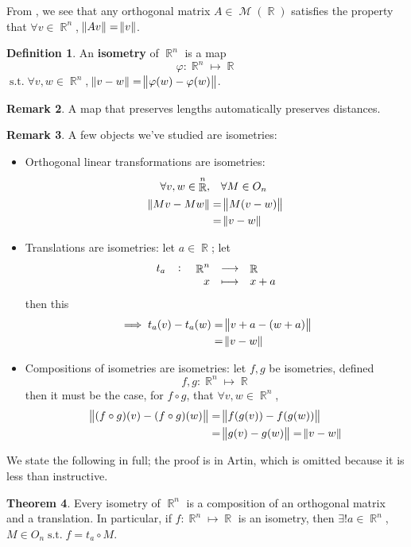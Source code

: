 \documentclass[11pt]{amsart} %
\theoremstyle{definition}
\newtheorem{definition}{Definition}[section]
\newtheorem{theorem}[definition]{Theorem}
\theoremstyle{definition}
\newtheorem{remark}[definition]{Remark}
\DeclareMathOperator{\R}{\mathbb{R}}
\DeclareMathOperator{\suchthat}{\text{ s.t. }}
\DeclareMathOperator{\Ma}{\mathcal{M}}
\numberwithin{equation}{section}
\begin{document}
From , we see that any orthogonal matrix $A \in \Ma (\R)$ satisfies the property that $\forall v \in \R^n$, $\norm{Av} = \norm{v} $. 

\begin{definition}
	An \textbf{isometry} of $\R^n$ is a map
	$$\varphi : \R^n \mapsto \R$$
	$\suchthat \forall v,w \in \R^n$, $\norm{v-w} = \norm{\varphi(w) - \varphi(w) }  $.
\end{definition}

\begin{remark}
	A map that preserves lengths automatically preserves distances.
\end{remark}

\begin{remark}
	A few objects we've studied are isometries:
	\begin{itemize}%
		\item Orthogonal linear transformations are isometries:
		\begin{align*}
			\forall v,w \in \R^n, &\quad \forall M \in O_n \\
			\norm{Mv - Mw} &= \norm{ M(v-w)}   \\
			&= \norm{v-w} 
		\end{align*}
		
		\item Translations are isometries: let $a\in \R$; let
		$$		 \fullfunction{t_a}{\R^n}{\R}{x}{x+a} $$
		then this
		\begin{align*}
		\implies t_a(v)-t_a (w) &= \norm{ v+a - (w+a) }  \\
		&= \norm{v-w} 
		\end{align*}
		
		\item Compositions of isometries are isometries: let $f,g$ be isometries, defined
		$$f,g : \R^n \mapsto \R$$
		then it must be the case, for $f\circ g$, that $\forall v,w\in \R^n$,
		\begin{align*}
			\norm{ (f\circ g)(v) - (f\circ g)(w) } &= \norm{ f(g(v)) - f(g(w)) }  \\
			&= \norm{g(v) - g(w) } = \norm{v-w} 
		\end{align*}
	\end{itemize}
\end{remark}

We state the following in full; the proof is in Artin, which is omitted because it is less than instructive.

\begin{theorem}
	\label{thmisometriesofRn}
	Every isometry of $\R^n$ is a composition of an orthogonal matrix and a translation. In particular, if $f: \R^n \mapsto \R$ is an isometry, then $\exists! a\in \R^n$, $M \in O_n \suchthat f = t_a \circ M$.
\end{theorem}
\end{document}

